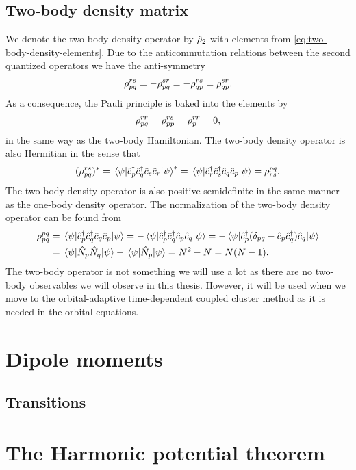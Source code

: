         \subsection{Two-body density matrix}
            We denote the two-body density operator by $\hat{\rho}_2$ with
            elements from \autoref{eq:two-body-density-elements}.
            Due to the anticommutation relations between the second quantized
            operators we have the anti-symmetry
            \begin{align}
                \rho^{rs}_{pq}
                = -\rho^{sr}_{pq}
                = -\rho^{rs}_{qp}
                = \rho^{sr}_{qp}.
            \end{align}
            As a consequence, the Pauli principle is baked into the elements by
            \begin{align}
                \rho^{rr}_{pq}
                = \rho^{rs}_{pp}
                = \rho^{rr}_{p}
                = 0,
            \end{align}
            in the same way as the two-body Hamiltonian.
            The two-body density operator is also Hermitian in the sense that
            \begin{align}
                (\rho^{rs}_{pq})^{*}
                = \mel{\psi}{\hat{c}_{p}^{\dagger}\hat{c}_{q}^{\dagger}\hat{c}_{s}\hat{c}_{r}}{\psi}^{*}
                = \mel{\psi}{\hat{c}_{r}^{\dagger}\hat{c}_{s}^{\dagger}\hat{c}_{q}\hat{c}_{p}}{\psi}
                = \rho^{pq}_{rs}.
            \end{align}
            The two-body density operator is also positive semidefinite in the
            same manner as the one-body density operator.
            The normalization of the two-body density operator can be found from
            \begin{align}
                \rho^{pq}_{pq}
                &= \mel{\psi}{\hat{c}_{p}^{\dagger}\hat{c}_{q}^{\dagger}\hat{c}_{q}\hat{c}_{p}}{\psi}
                = -\mel{\psi}{\hat{c}_{p}^{\dagger}\hat{c}_{q}^{\dagger}\hat{c}_{p}\hat{c}_{q}}{\psi}
                = -\mel{\psi}{
                    \hat{c}_{p}^{\dagger}(\delta_{pq} - \hat{c}_{p}\hat{c}_{q}^{\dagger})\hat{c}_{q}
                }{\psi}
                \\
                &=
                \mel{\psi}{\hat{N}_{p}\hat{N}_{q}}{\psi}
                - \mel{\psi}{\hat{N}_{p}}{\psi}
                = N^2 - N
                = N(N - 1).
            \end{align}
            The two-body operator is not something we will use a lot as there
            are no two-body observables we will observe in this thesis.
            However, it will be used when we move to the orbital-adaptive
            time-dependent coupled cluster method as it is needed in the orbital
            equations.

    \section{Dipole moments}
        \subsection{Transitions}

    \section{The Harmonic potential theorem}

